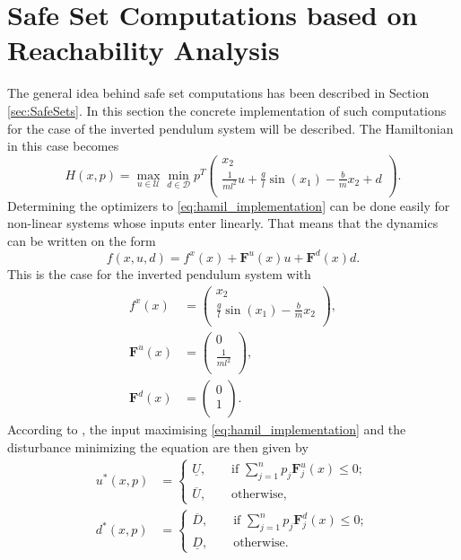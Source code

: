 \documentclass[../main.tex]{subfiles}
\begin{document}
\section{Safe Set Computations based on Reachability Analysis}
The general idea behind safe set computations has been described in Section \ref{sec:SafeSets}. In this section the concrete implementation of such computations for the case of the inverted pendulum system will be described. The Hamiltonian in this case becomes 
\begin{equation}\label{eq:hamil_implementation}
    H(x,p) = \max_{u \in \mathcal{U}} \min_{d \in \mathcal{D}} p^T 
\left(
\begin{array}{c}
x_2\\
\frac{1}{ml^2}u+\frac{g}{l}\sin(x_1)-\frac{b}{m}x_2+d\\
\end{array}
\right).
\end{equation}
Determining the optimizers to \eqref{eq:hamil_implementation} can be done easily for non-linear systems whose inputs enter linearly. That means that the dynamics can be written on the form
\begin{equation}
    f(x,u,d) = f^x(x)+\textbf{F}^u(x)u+\textbf{F}^d(x)d.
\end{equation}
This is the case for the inverted pendulum system with
\begin{align}
    f^x(x) &= \left(
\begin{array}{c}
x_2\\
\frac{g}{l}\sin(x_1)-\frac{b}{m}x_2\\
\end{array}
\right),\\
    \textbf{F}^u(x) &= \left(
\begin{array}{c}
0\\
\frac{1}{ml^2}\\
\end{array}
\right),\\
    \textbf{F}^d(x) &= \left(
    \begin{array}{c}
0\\
1\\
\end{array}
\right).
\end{align}
According to \cite{mitchell2004toolbox}, the input maximising \eqref{eq:hamil_implementation} and the disturbance minimizing the equation are then given by 
\begin{align}
    u^*(x,p)&=
\begin{cases}
  \underline{U},\qquad \text{if } \sum_{j=1}^n p_j \textbf{F}^u_j(x)\leq 0;\\
  \overline{U}, \qquad \text{otherwise,}
\end{cases}\\
    d^*(x,p)&=
\begin{cases}
  \overline{D},\qquad \text{if } \sum_{j=1}^n p_j \textbf{F}^d_j(x)\leq 0;\\
  \underline{D}, \qquad \text{otherwise}.
\end{cases}
\end{align}
\end{document}
